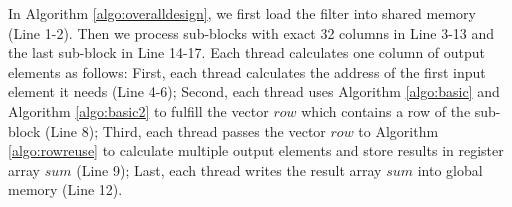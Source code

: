 In Algorithm \ref{algo:overalldesign}, we first load the filter into shared memory (Line 1-2). Then we process sub-blocks with exact 32
columns in Line 3-13 and the last sub-block in Line 14-17. Each thread calculates one column of output elements as follows: First, each
thread calculates the address of the first input element it needs (Line 4-6); Second, each thread uses Algorithm \ref{algo:basic} and
Algorithm \ref{algo:basic2} to fulfill the vector $row$ which contains a row of the sub-block (Line 8); Third, each thread passes the
vector $row$ to Algorithm \ref{algo:rowreuse} to calculate multiple output elements and store results in register array $sum$ (Line 9);
Last, each thread writes the result array $sum$ into global memory (Line 12).
